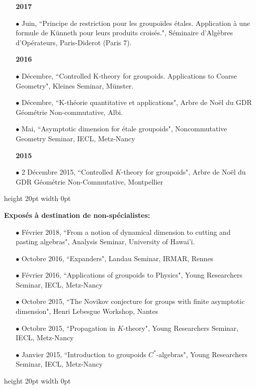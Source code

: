 \documentclass[a4paper,11pt]{article}
\newcommand\espace{\vrule height 20pt width 0pt}
\begin{document}
\begin{itemize}
\item[\textbf{2017}]
\item[$\bullet$] Juin, ``Principe de restriction pour les groupoïdes étales. Application à une formule de Künneth pour leurs produits croisés.", Séminaire d'Algèbres d'Opérateurs, Paris-Diderot (Paris 7).
\end{itemize}
\newpage
\begin{itemize}
\item[\textbf{2016}]
\item[$\bullet$] D\'ecembre, ``Controlled K-theory for groupoids. Applications to Coarse Geometry", Kleines Seminar, Münster.
\item[$\bullet$] D\'ecembre, ``K-théorie quantitative et applications", Arbre de Noël du GDR Géométrie Non-commutative, Albi.
\item[$\bullet$] Mai, ``Asymptotic dimension for étale groupoids", Noncommutative Geometry Seminar, IECL, Metz-Nancy
\end{itemize}

\begin{itemize}
\item[\textbf{2015}]
\item[$\bullet$] 2 D\'ecembre 2015, ``Controlled $K$-theory for groupoids", Arbre de Noël du GDR Géométrie Non-Commutative, Montpellier
\end{itemize}
\espace

\textbf{Expos\'es \`a destination de non-sp\'ecialistes:}\\

\begin{itemize}
\item[$\bullet$] F\'evrier 2018, ``From a notion of dynamical dimension to cutting and pasting algebras", Analysis Seminar, University of Hawai'i.
\item[$\bullet$] Octobre 2016, ``Expanders", Landau Seminar, IRMAR, Rennes %
\item[$\bullet$] F\'evrier 2016, ``Applications of groupoids to Physics", Young Researchers Seminar, IECL, Metz-Nancy
\item[$\bullet$] Octobre 2015, ``The Novikov conjecture for groups with finite asymptotic dimension", Henri Lebesgue Workshop, Nantes
\item[$\bullet$] Octobre 2015, ``Propagation in $K$-theory", Young Researchers Seminar, IECL, Metz-Nancy
\item[$\bullet$] Janvier 2015, ``Introduction to groupoids $C^*$-algebras", Young Researchers Seminar, IECL, Metz-Nancy
\end{itemize}
\espace
\end{document}
